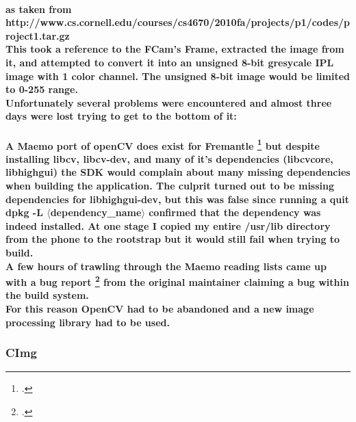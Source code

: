 \documentclass[11pt]{article} %
\begin{document}
\paragraph{as taken from http://www.cs.cornell.edu/courses/cs4670/2010fa/projects/p1/codes/project1.tar.gz\\
This took a reference to the FCam's Frame, extracted the image from it, and attempted to convert it into an unsigned 8-bit gresycale IPL image with 1 color channel. The unsigned 8-bit image would be limited to 0-255 range.\\
Unfortunately several problems were encountered and almost three days were lost trying to get to the bottom of it:}
\paragraph{
A Maemo port of openCV does exist for Fremantle \footcite{libcv} but despite installing libcv, libcv-dev, and many of it's dependencies (libcvcore, libhighgui) the SDK would complain about many missing dependencies when building the application. The culprit turned out to be missing dependencies for libhighgui-dev, but this was false since running a quit dpkg -L \(\langle\)dependency\_name\(\rangle\) confirmed that the dependency was indeed installed. At one stage I copied my entire /usr/lib directory from the phone to the rootstrap but it would still fail when trying to build.\\
A few hours of trawling through the Maemo reading lists came up with a bug report \footcite{highgui-dev} from the original maintainer claiming a bug within the build system.\\
For this reason OpenCV had to be abandoned and a new image processing library had to be used.
}
\subsubsection{CImg}
\end{document}

